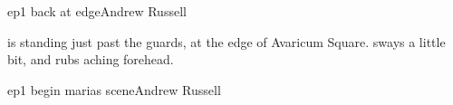 \documentclass{book}
\begin{document}
\begin{childnode}{ep1 back at edge}{Andrew Russell}

    \name{} is standing just past the guards, at the edge of Avaricum Square. \HeShe{} sways
    a little bit, and rubs \hisher{} aching forehead.

\end{childnode}

\begin{childnode}{ep1 begin marias scene}{Andrew Russell}

\end{childnode}
\end{document}
